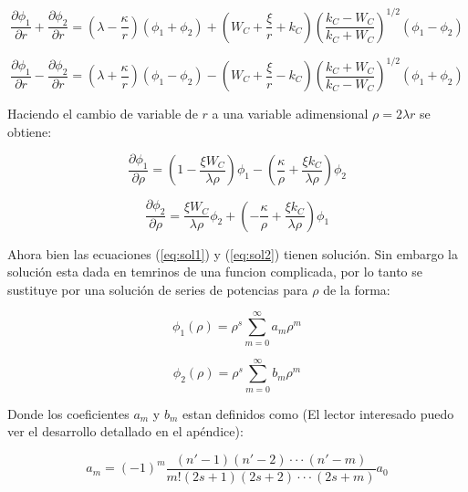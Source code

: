 \documentclass[a4paper, 12pt]{article} %
\begin{document}
\begin{equation}\label{eq:phi1-1}
\dfrac{\partial \phi_1}{\partial r} + \dfrac{\partial \phi_2}{\partial r}
= \left( \lambda - \dfrac{\kappa}{r} \right)(\phi_1 + \phi_2) 
+ \left ( W_C + \dfrac{\xi}{r} + k_C \right) 
\left(\dfrac{k_C - W_C }{k_C + W_C} \right)^{1/2} (\phi_1 - \phi_2)
\end{equation}

\begin{equation}\label{eq:phi2-1}
\dfrac{\partial \phi_1}{\partial r} - \dfrac{\partial \phi_2}{\partial r}
= \left( \lambda + \dfrac{\kappa}{r} \right)(\phi_1 - \phi_2) 
- \left ( W_C + \dfrac{\xi}{r} - k_C \right) 
\left(\dfrac{k_C + W_C }{k_C - W_C} \right)^{1/2} (\phi_1 + \phi_2)
\end{equation}

Haciendo el cambio de variable de $r$ a una variable adimensional $\rho = 2 \lambda r$
se obtiene:

\begin{equation}\label{eq:sol1}
\dfrac{\partial \phi_1}{\partial \rho} = \left( 1-\dfrac{\xi W_C}{\lambda  \rho} \right) 
\phi_1 - \left( \dfrac{\kappa}{\rho} + \dfrac{\xi k_C}{\lambda \rho}  \right)\phi_2
\end{equation}

\begin{equation}\label{eq:sol2}
\dfrac{\partial \phi_2}{\partial \rho} = \dfrac{\xi W_C}{\lambda  \rho} \phi_2 
+ \left( -\dfrac{\kappa}{\rho} + \dfrac{\xi k_C}{\lambda \rho}  \right)\phi_1
\end{equation}

Ahora bien las ecuaciones (\ref{eq:sol1}) y (\ref{eq:sol2}) tienen soluci\'on. 
Sin embargo la soluci\'on esta dada en temrinos de una funcion complicada, 
por lo tanto se sustituye por una soluci\'on de series de potencias para 
$\rho$ de la forma:

\begin{equation}\label{eq:phi1}
\phi_1(\rho) = \rho^s \sum \limits_{m=0}^{\infty} a_m \rho^m
\end{equation}


\begin{equation} \label{eq:phi2}
\phi_2(\rho) = \rho^s \sum \limits_{m=0}^{\infty} b_m \rho^m
\end{equation}

Donde los coeficientes $a_m$ y $b_m$ estan definidos como (El lector interesado 
puedo ver el desarrollo detallado en el ap\'endice):

\begin{equation}
a_m = (-1)^m \dfrac{(n'-1)(n'-2)\cdot\cdot\cdot(n'-m)}{m!(2s+1)(2s+2)\cdot\cdot\cdot(2s+m)}a_0
\end{equation}
\end{document}
